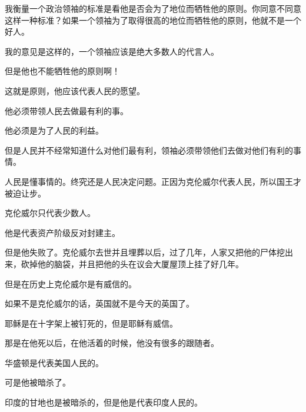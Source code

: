 我衡量一个政治领袖的标准是看他是否会为了地位而牺牲他的原则。你同意不同意这样一种标准？如果一个领袖为了取得很高的地位而牺牲他的原则，他就不是一个好人。

我的意见是这样的，一个领袖应该是绝大多数人的代言人。

但是他也不能牺牲他的原则啊！

这就是原则，他应该代表人民的愿望。

他必须带领人民去做最有利的事。

他必须是为了人民的利益。

但是人民并不经常知道什么对他们最有利，领袖必须带领他们去做对他们有利的事情。

人民是懂事情的。终究还是人民决定问题。正因为克伦威尔代表人民，所以国王才被迫让步。

克伦威尔只代表少数人。

他是代表资产阶级反对封建主。

但是他失败了。克伦威尔去世并且埋葬以后，过了几年，人家又把他的尸体挖出来，砍掉他的脑袋，并且把他的头在议会大厦屋顶上挂了好几年。

但是在历史上克伦威尔是有威信的。

如果不是克伦威尔的话，英国就不是今天的英国了。

耶稣是在十字架上被钉死的，但是耶稣有威信。

那是在他死以后，在他活着的时候，他没有很多的跟随者。

华盛顿是代表美国人民的。

可是他被暗杀了。

印度的甘地也是被暗杀的，但是他是代表印度人民的。

